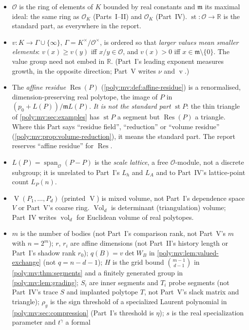 \documentclass[11pt,a4paper]{article}
\numberwithin{equation}{section}
\theoremstyle{plain}
\newcommand{\R}{\mathbb R}
\newcommand{\st}{\operatorname{st}}
\newcommand{\Span}{\operatorname{span}_{\R}}%
\newcommand{\cO}{\mathcal{O}}
\newcommand{\vol}{\operatorname{vol}}
\newcommand{\OO}{\mathcal O}
\newcommand{\mm}{\mathfrak m}
\renewcommand{\vv}{\operatorname{v}}%
\newcommand{\Vol}{\operatorname{Vol}}
\newcommand{\MV}{\operatorname{V}}
\newcommand{\spanplain}{\operatorname{span}}%
\newcommand{\Res}{\operatorname{Res}}
\begin{document}
\begin{itemize}
\item $\OO$ is the ring of elements of $K$ bounded by real constants and $\mm$ its
  maximal ideal: the same ring as $\cO_K$ (Parts~I--II) and $\mathcal O_K$
  (Part~IV). $\st:\OO\to\R$ is the standard part, as everywhere in the report.
\item $v:K\to\Gamma\cup\{\infty\}$, $\Gamma=K^\times/\OO^\times$, is ordered so
  that \emph{larger values mean smaller elements}: $v(x)\ge v(y)$ iff
  $x/y\in\OO$, and $v(x)>0$ iff $x\in\mm\setminus\{0\}$. The value group need
  not embed in $\R$. (Part~I's leading exponent measures growth, in the
  opposite direction; Part~V writes $\nu$ and $\vv$.)
\item The \emph{affine residue} $\Res(P)$ (\cref{poly:mv:def:affine-residue}) is a
  renormalised, dimension-preserving real polytope, the image of $P$ in
  $(p_0+L(P))/\mm L(P)$. \emph{It is not the standard part} $\st P$: the thin
  triangle of \cref{poly:mv:sec:examples} has $\st P$ a segment but $\Res(P)$ a
  triangle. Where this Part says ``residue field'', ``reduction'' or ``volume
  residue'' (\cref{poly:mv:prop:volume-reduction}), it means the standard part.
  The report reserves ``affine residue'' for $\Res$.
\item $L(P)=\spanplain_{\OO}(P-P)$ is the \emph{scale lattice}, a free
  $\OO$-module, not a discrete subgroup; it is unrelated to Part~I's $L_h$ and
  $L_A$ and to Part~IV's lattice-point count $L_P(n)$.
\item $\MV(P_1,\ldots,P_d)$ (printed $\operatorname{V}$) is mixed volume, not
  Part~I's dependence space $V$ or Part~V's coarse ring. $\Vol_d$ is determinant
  (triangulation) volume; Part~IV writes $\vol_d$ for Euclidean volume of real
  polytopes.
\item $m$ is the number of bodies (not Part~I's comparison rank, not Part~V's
  $m$ with $n=2^m$); $r$, $r_i$ are affine dimensions (not Part~II's history
  length or Part~I's shadow rank $r_0$); $q(B)=v\det W_B$ in
  \cref{poly:mv:lem:valued-exchange} (not $q=n-d-1$); $H$ is the grid bound
  $\binom{m-1}{d-1}$ in \cref{poly:mv:thm:segments} and a finitely generated
  group in \cref{poly:mv:lem:grading}; $S_i$ are inner segments and $T_i$ probe
  segments (not Part~IV's trace $S$ and implanted polytope $T$, not Part~V's
  slack matrix and triangle); $\rho_g$ is the sign threshold of a specialized
  Laurent polynomial in \cref{poly:mv:sec:compression} (Part~I's threshold is
  $\eta$); $s$ is the real specialization parameter and $t^\gamma$ a formal

\end{itemize}
\end{document}
